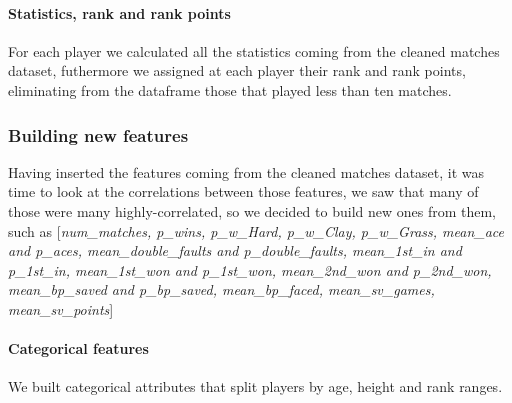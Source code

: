 \paragraph{Statistics, rank and rank points} For each player we calculated all the statistics coming from the cleaned matches dataset, futhermore we assigned at each player their rank and rank points, eliminating from the dataframe those that played less than ten matches.

\subsubsection{Building new features}

Having inserted the features coming from the cleaned matches dataset, it was time to look at the correlations between those features, we saw that many of those were many highly-correlated, so we decided to build new ones from them, such as [\textit{num\_matches, p\_wins, p\_w\_Hard, p\_w\_Clay, p\_w\_Grass, mean\_ace and p\_aces, mean\_double\_faults and p\_double\_faults, mean\_1st\_in and p\_1st\_in, mean\_1st\_won and p\_1st\_won, mean\_2nd\_won and p\_2nd\_won,\\mean\_bp\_saved and p\_bp\_saved, mean\_bp\_faced, mean\_sv\_games, mean\_sv\_points}]

\paragraph{Categorical features} We built categorical attributes that split players by age, height and rank ranges.
\vspace{3mm}

